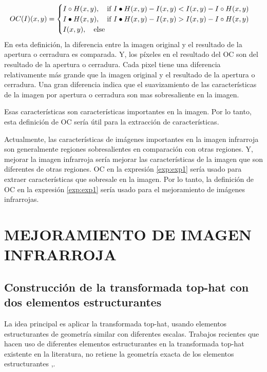 \documentclass[a4paper, 11 pt, conference]{ieeeconf}      %
\begin{document}
\tiny 
\begin{equation} \label{eq:operadorcambio}
 \centering    
 OC(I)(x,y) = 
    \begin{cases}
    I \circ H(x,y), \quad \text{if } I \bullet H(x,y)-I(x,y) < I(x,y)-I \circ H(x,y) \\
     I \bullet H(x,y), \quad \text{if } I \bullet H(x,y)-I(x,y) > I(x,y)-I \circ H(x,y) \\
    I(x,y), \quad \text{else }
    \end{cases}

\end{equation}
\normalsize
En esta definici\'on, la diferencia entre la imagen original y el resultado de la apertura o cerradura es comparada. Y, los p\'ixeles en el resultado del OC son del resultado de la apertura o cerradura. Cada pixel tiene una diferencia relativamente m\'as grande que la imagen original y el resultado de la apertura o cerradura. Una gran diferencia indica que el suavizamiento de las caracter\'isticas de la imagen por apertura o cerradura son mas sobresaliente en la imagen.

Esas caracter\'isticas son caracter\'isticas importantes en la imagen. Por lo tanto, esta definici\'on de OC ser\'ia \'util para la extracci\'on de caracter\'isticas.

Actualmente, las caracter\'isticas de im\'agenes importantes en la imagen infrarroja son generalmente regiones sobresalientes en comparaci\'on con otras regiones. Y, mejorar la imagen infrarroja ser\'ia mejorar las caracter\'isticas de la imagen que son diferentes de otras regiones. OC en la expresi\'on \eqref{exp:exp1} ser\'ia usado para extraer caracter\'isticas que sobresale en la imagen. Por lo tanto, la definici\'on de OC en la expresi\'on \eqref{exp:exp1} ser\'ia usado para el mejoramiento de im\'agenes infrarrojas.
\\
\section{MEJORAMIENTO DE IMAGEN INFRARROJA}
\subsection{Construcci\'on de la transformada top-hat con dos elementos estructurantes}

La idea principal es aplicar la transformada top-hat, usando elementos estructurantes de geometr\'ia similar con diferentes escalas. Trabajos recientes que hacen uso de diferentes elementos estructurantes en la transformada top-hat existente en la literatura, no retiene la geometr\'ia exacta de los elementos estructurantes \cite{18},\cite{19}.
\end{document}
